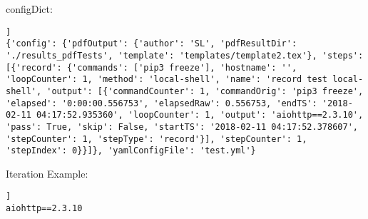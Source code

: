 \documentclass[10pt,a4paper]{article}
\begin{document}
configDict:

\begin{lstlisting}[]]
{'config': {'pdfOutput': {'author': 'SL', 'pdfResultDir': './results_pdfTests', 'template': 'templates/template2.tex'}, 'steps': [{'record': {'commands': ['pip3 freeze'], 'hostname': '', 'loopCounter': 1, 'method': 'local-shell', 'name': 'record test local-shell', 'output': [{'commandCounter': 1, 'commandOrig': 'pip3 freeze', 'elapsed': '0:00:00.556753', 'elapsedRaw': 0.556753, 'endTS': '2018-02-11 04:17:52.935360', 'loopCounter': 1, 'output': 'aiohttp==2.3.10', 'pass': True, 'skip': False, 'startTS': '2018-02-11 04:17:52.378607', 'stepCounter': 1, 'stepType': 'record'}], 'stepCounter': 1, 'stepIndex': 0}}]}, 'yamlConfigFile': 'test.yml'}
\end{lstlisting}



Iteration Example:

      \begin{lstlisting}[]]
aiohttp==2.3.10
\end{lstlisting}
      
\end{document}
